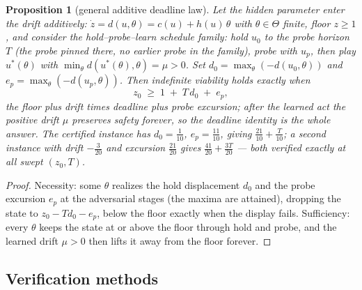 \documentclass[10pt,twocolumn]{article}
\theoremstyle{plain}
\newtheorem{proposition}[theorem]{Proposition}
\theoremstyle{definition}
\theoremstyle{remark}
\begin{document}
\begin{proposition}[general additive deadline law]\label{prop:additivelaw}
Let the hidden parameter enter the drift additively:
\(\dot z = d(u, \theta) = c(u) + h(u)\,\theta\) with
\(\theta \in \Theta\) finite, floor \(z \ge 1\), and consider the
hold--probe--learn schedule family: hold \(u_{0}\) to the probe horizon
\(T\) (the probe pinned there, no earlier probe in the family), probe
with \(u_{p}\), then play \(u^{*}(\theta)\) with
\(\min_{\theta} d(u^{*}(\theta), \theta) = \mu > 0\). Set
\(d_{0} = \max_{\theta}(-d(u_{0}, \theta))\) and
\(e_{p} = \max_{\theta}(-d(u_{p}, \theta))\). Then indefinite
viability holds exactly when
\[
z_{0} \;\ge\; 1 \;+\; T\, d_{0} \;+\; e_{p},
\]
the floor plus drift times deadline plus probe excursion; after the
learned act the positive drift \(\mu\) preserves safety forever, so
the deadline identity is the whole answer. The certified instance has
\(d_{0} = \tfrac1{10}\), \(e_{p} = \tfrac{11}{10}\), giving
\(\tfrac{21}{10} + \tfrac{T}{10}\); a second instance with drift
\(-\tfrac{3}{20}\) and excursion \(\tfrac{21}{20}\) gives
\(\tfrac{41}{20} + \tfrac{3T}{20}\) --- both verified exactly at all
swept \((z_{0}, T)\).
\end{proposition}

\begin{proof}
Necessity: some \(\theta\) realizes the hold displacement \(d_{0}\)
and the probe excursion \(e_{p}\) at the adversarial stages (the maxima
are attained), dropping the state to
\(z_{0} - T d_{0} - e_{p}\), below the floor exactly when the display
fails. Sufficiency: every \(\theta\) keeps the state at or above the
floor through hold and probe, and the learned drift \(\mu > 0\) then
lifts it away from the floor forever.
\end{proof}

\subsection{Verification methods}\label{methods}
\end{document}
